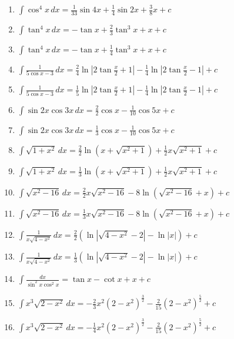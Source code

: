\documentclass[11pt,a4paper]{article}
\begin{document}
\begin{enumerate}
\item $\displaystyle \int \cos^{4} x \, dx = \frac{1}{33}\sin 4x + \frac{1}{4}\sin 2x + \frac{3}{8}x + c$
\item $\displaystyle \int \tan^{4} x \, dx = -\tan x + \frac{2}{3}\tan^{3} x + x + c$
\item $\displaystyle \int \tan^{4} x \, dx = -\tan x + \frac{1}{4}\tan^{3} x + x + c$
\item $\displaystyle \int \frac{1}{5\cos x - 3} \, dx = \frac{2}{4}\ln\left|2\tan\frac{x}{2} + 1\right| - \frac{1}{4}\ln\left|2\tan\frac{x}{2} - 1\right| + c$
\item $\displaystyle \int \frac{1}{5\cos x - 3} \, dx = \frac{1}{5}\ln\left|2\tan\frac{x}{2} + 1\right| - \frac{1}{4}\ln\left|2\tan\frac{x}{2} - 1\right| + c$
\item $\displaystyle \int \sin 2x \cos 3x \, dx = \frac{2}{2}\cos x - \frac{1}{10}\cos 5x + c$
\item $\displaystyle \int \sin 2x \cos 3x \, dx = \frac{1}{3}\cos x - \frac{1}{10}\cos 5x + c$
\item $\displaystyle \int \sqrt{1 + x^{2}} \, dx = \frac{2}{2}\ln\left(x + \sqrt{x^{2} + 1}\right) + \frac{1}{2}x\sqrt{x^{2} + 1} + c$
\item $\displaystyle \int \sqrt{1 + x^{2}} \, dx = \frac{1}{3}\ln\left(x + \sqrt{x^{2} + 1}\right) + \frac{1}{2}x\sqrt{x^{2} + 1} + c$
\item $\displaystyle \int \sqrt{x^{2} - 16} \, dx = \frac{2}{2}x\sqrt{x^{2} - 16} - 8\ln\left(\sqrt{x^{2} - 16} + x\right) + c$
\item $\displaystyle \int \sqrt{x^{2} - 16} \, dx = \frac{1}{3}x\sqrt{x^{2} - 16} - 8\ln\left(\sqrt{x^{2} - 16} + x\right) + c$
\item $\displaystyle \int \frac{1}{x\sqrt{4 - x^{2}}} \, dx = \frac{2}{2}\left(\ln\left|\sqrt{4 - x^{2}} - 2\right| - \ln|x|\right) + c$
\item $\displaystyle \int \frac{1}{x\sqrt{4 - x^{2}}} \, dx = \frac{1}{3}\left(\ln\left|\sqrt{4 - x^{2}} - 2\right| - \ln|x|\right) + c$
\item $\displaystyle \int \frac{dx}{\sin^{2} x \cos^{2} x} = \tan x - \cot x + x + c$
\item $\displaystyle \int x^{3}\sqrt{2 - x^{2}} \, dx = -\frac{2}{3}x^{2}\left(2 - x^{2}\right)^{\frac{3}{2}} - \frac{2}{15}\left(2 - x^{2}\right)^{\frac{5}{2}} + c$
\item $\displaystyle \int x^{3}\sqrt{2 - x^{2}} \, dx = -\frac{1}{4}x^{2}\left(2 - x^{2}\right)^{\frac{3}{2}} - \frac{2}{15}\left(2 - x^{2}\right)^{\frac{5}{2}} + c$

\end{enumerate}
\end{document}
